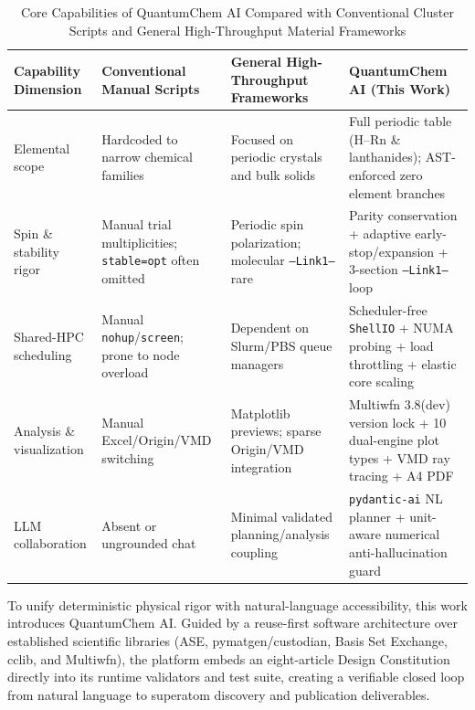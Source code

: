 \documentclass[journal=jcisd8,manuscript=article]{achemso}
\begin{document}
\begin{table}[htbp]
  \centering
  \caption{Core Capabilities of QuantumChem AI Compared with Conventional Cluster Scripts and General High-Throughput Material Frameworks}
  \label{tab:capabilities}
  \footnotesize
  \begin{tabular}{>{\raggedright\arraybackslash}p{2.4cm} >{\raggedright\arraybackslash}p{3.6cm} >{\raggedright\arraybackslash}p{3.7cm} >{\raggedright\arraybackslash}p{4.3cm}}
    \toprule
    Capability Dimension & Conventional Manual Scripts & General High-Throughput Frameworks & QuantumChem AI (This Work) \\
    \midrule
    Elemental scope & Hardcoded to narrow chemical families & Focused on periodic crystals and bulk solids & Full periodic table (H--Rn \& lanthanides); AST-enforced zero element branches \\
    Spin \& stability rigor & Manual trial multiplicities; \texttt{stable=opt} often omitted & Periodic spin polarization; molecular \texttt{--Link1--} rare & Parity conservation + adaptive early-stop/expansion + 3-section \texttt{--Link1--} loop \\
    Shared-HPC scheduling & Manual \texttt{nohup}/\texttt{screen}; prone to node overload & Dependent on Slurm/PBS queue managers & Scheduler-free \texttt{ShellIO} + NUMA probing + load throttling + elastic core scaling \\
    Analysis \& visualization & Manual Excel/Origin/VMD switching & Matplotlib previews; sparse Origin/VMD integration & Multiwfn 3.8(dev) version lock + 10 dual-engine plot types + VMD ray tracing + A4 PDF \\
    LLM collaboration & Absent or ungrounded chat & Minimal validated planning/analysis coupling & \texttt{pydantic-ai} NL planner + unit-aware numerical anti-hallucination guard \\
    \bottomrule
  \end{tabular}
\end{table}

To unify deterministic physical rigor with natural-language accessibility, this work introduces QuantumChem AI. Guided by a reuse-first software architecture over established scientific libraries (ASE,\cite{larsen2017ase} pymatgen/custodian,\cite{ong2013pymatgen} Basis Set Exchange,\cite{pritchard2019bse} cclib,\cite{oboyle2008cclib} and Multiwfn\cite{lu2012multiwfn}), the platform embeds an eight-article Design Constitution directly into its runtime validators and test suite, creating a verifiable closed loop from natural language to superatom discovery and publication deliverables.
\end{document}

